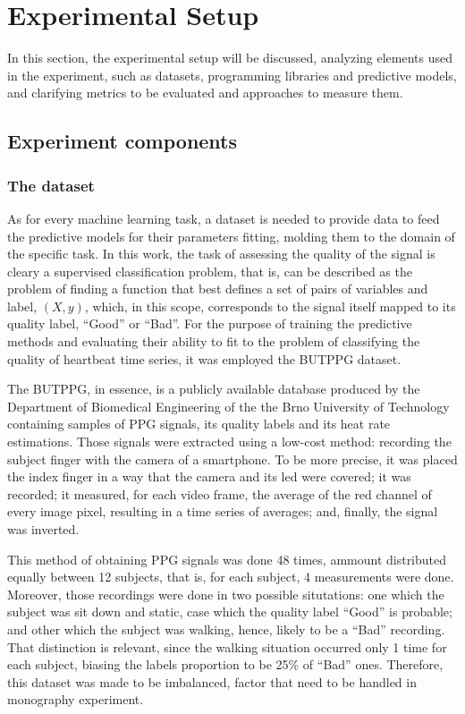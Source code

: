\section{Experimental Setup}

In this section, the experimental setup will be discussed, analyzing elements used in the experiment, such as datasets, programming libraries and predictive models, and clarifying metrics to be evaluated and approaches to measure them.  

\subsection{Experiment components}

\subsubsection{The dataset}

As for every machine learning task, a dataset is needed to provide data to feed the predictive models for their parameters fitting, molding them to the domain of the specific task. In this work, the task of assessing the quality of the signal is cleary a supervised classification problem, that is, can be described as the problem of finding a function that best defines a set of pairs of variables and label, $(X,y)$, which, in this scope, corresponds to the signal itself mapped to its quality label, ``Good'' or ``Bad''. For the purpose of training the predictive methods and evaluating their ability to fit to the problem of classifying the quality of heartbeat time series, it was employed the \acrshort{BUTPPG} dataset.

The \acrfull{BUTPPG}, in essence, is a publicly available database produced by the Department of Biomedical Engineering of the the Brno University of Technology containing samples of \acrshort{PPG} signals, its quality labels and its heat rate estimations. Those signals were extracted using a low-cost method: recording the subject finger with the camera of a smartphone. To be more precise, it was placed the index finger in a way that the camera and its led were covered; it was recorded; it measured, for each video frame, the average of the red channel of every image pixel, resulting in a time series of averages; and, finally, the signal was inverted.  

This method of obtaining \acrshort{PPG} signals was done 48 times, ammount distributed equally between 12 subjects, that is, for each subject, 4 measurements were done. Moreover, those recordings were done in two possible situtations: one which the subject was sit down and static, case which the quality label ``Good'' is probable; and other which the subject was walking, hence, likely to be a ``Bad'' recording. That distinction is relevant, since the walking situation occurred only 1 time for each subject, biasing the labels proportion to be 25\% of ``Bad'' ones. Therefore, this dataset was made to be imbalanced, factor that need to be handled in monography experiment.

